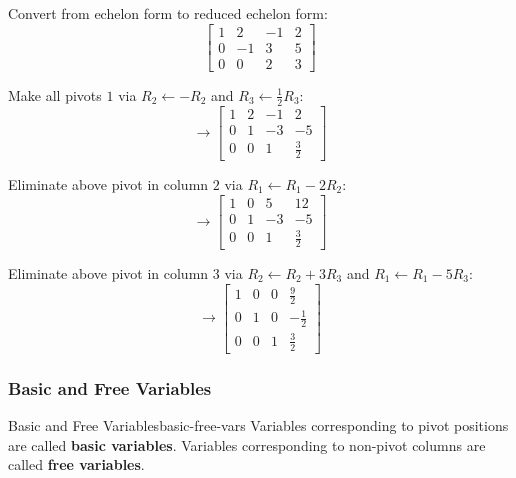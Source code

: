 \begin{example}
  Convert from echelon form to reduced echelon form:
  \[
    \left[
      \begin{array}{ccc|c}
        1 & 2  & -1 & 2 \\
        0 & -1 & 3  & 5 \\
        0 & 0  & 2  & 3
      \end{array}
      \right]
  \]

  Make all pivots $1$ via $R_2 \leftarrow -R_2$ and $R_3 \leftarrow \tfrac{1}{2}R_3$:
  \[
    \longrightarrow
    \left[
      \begin{array}{ccc|c}
        1 & 2 & -1 & 2            \\
        0 & 1 & -3 & -5           \\
        0 & 0 & 1  & \tfrac{3}{2}
      \end{array}
      \right]
  \]

  Eliminate above pivot in column $2$ via $R_1 \leftarrow R_1 - 2R_2$:
  \[
    \longrightarrow
    \left[
      \begin{array}{ccc|c}
        1 & 0 & 5  & 12           \\
        0 & 1 & -3 & -5           \\
        0 & 0 & 1  & \tfrac{3}{2}
      \end{array}
      \right]
  \]

  Eliminate above pivot in column $3$ via $R_2 \leftarrow R_2 + 3R_3$ and $R_1 \leftarrow R_1 - 5R_3$:
  \[
    \longrightarrow
    \left[
      \begin{array}{ccc|c}
        1 & 0 & 0 & \tfrac{9}{2}  \\
        0 & 1 & 0 & -\tfrac{1}{2} \\
        0 & 0 & 1 & \tfrac{3}{2}
      \end{array}
      \right]
  \]
\end{example}

\subsubsection{Basic and Free Variables}

\begin{definition}{Basic and Free Variables}{basic-free-vars}
  Variables corresponding to pivot positions are called \textbf{basic variables}. Variables corresponding to non-pivot columns are called \textbf{free variables}.
\end{definition}

